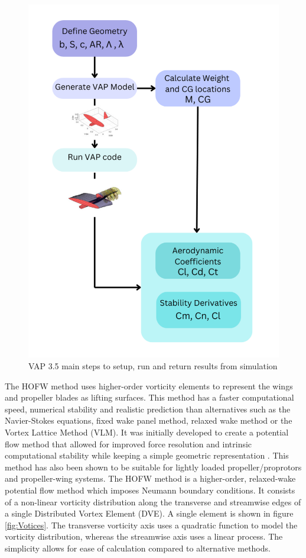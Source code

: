  \begin{figure}
 \includegraphics[]{04_Methodology/Figs/jasmine.png}
 \caption{VAP 3.5 main steps to setup, run and return results from simulation}
 \label{fig:flowchart}
 \end{figure}


The HOFW method uses higher-order vorticity elements to represent the wings and propeller blades as lifting surfaces. This method has a faster computational speed, numerical stability and realistic prediction than alternatives such as the Navier-Stokes equations, fixed wake panel method, relaxed wake method or the Vortex Lattice Method (VLM). It was initially developed to create a potential flow method that allowed for improved force resolution and intrinsic computational stability while keeping a simple geometric representation \cite{}. This method has also been shown to be suitable for lightly loaded propeller/proprotors and propeller-wing systems. The HOFW method is a higher-order, relaxed-wake potential flow method which imposes Neumann boundary conditions. It consists of a non-linear vorticity distribution along the transverse and streamwise edges of a single Distributed Vortex Element (DVE). A single element is shown in figure \ref{fig:Votices}. The transverse vorticity axis uses a quadratic function to model the vorticity distribution, whereas the streamwise axis uses a linear process. The simplicity allows for ease of calculation compared to alternative methods. 


